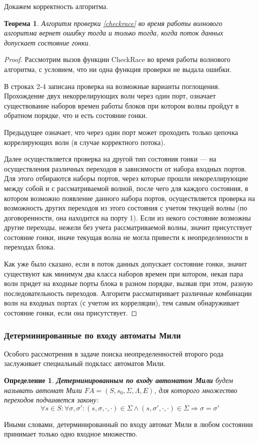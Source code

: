 \documentclass[10pt,a4paper]{article}
\newtheorem{defen}{Определение}
\newtheorem{theorem}{Теорема}
\newcommand{\FA}{F\!A}
\begin{document}
  Докажем корректность алгоритма.
  \begin{theorem}
    Алгоритм проверки \ref{checkrace} во время работы волнового алгоритма вернет ошибку
    тогда и только тогда, когда поток данных допускает состояние гонки.
  \end{theorem}
  \begin{proof}
    Рассмотрим вызов функции CheckRace во время работы волнового алгоритма, с условием, что ни одна функция проверки не выдала ошибки.
    
    В строках 2-4 записана проверка на возможные варианты поглощения. Прохождение двух некоррелирующих волн через один порт, означает существование наборов времен
    работы блоков при котором волны пройдут в обратном порядке, что и есть состояние гонки.
    
    Предыдущее означает, что через один порт может проходить только цепочка коррелирующих волн (в случае корректного потока).
    
    Далее осуществляется проверка на другой тип состояния гонки --- на осуществления различных переходов в зависимости от набора входных портов.
    Для этого отбираются наборы портов, через которые прошли некореллирующие между собой и с рассматриваемой волной, после чего для каждого состояния,
    в котором возможно появление данного набора портов, осуществляется проверка на возможность других переходов из этого состояния с учетом текущей волны
    (по договоренности, она находится на порту 1). Если из некого состояние возможны другие переходы, нежели без учета рассматриваемой волны,
    значит присутствует состояние гонки, иначе текущая волна не могла привести к неопределенности в переходах блока.
    
    Как уже было сказано, если в поток данных допускает состояние гонки, значит существуют как минимум два класса наборов времен
    при котором, некая пара волн придет на входные порты блока в разном порядке, вызвав при этом, разную последовательность переходов.
    Алгоритм рассматиривает различные комбинации волн на входных портах (с учетом их корреляции), тем самым обнаруживает состояние гонки, если она присутствует.
  \end{proof}
  
  \subsubsection{Детерминированные по входу автоматы Мили}
    Особого рассмотрения в задаче поиска неопределенностей второго рода заслуживает специальный подкласс автоматов Мили.
    \begin{defen}
      \textbf{Детерминированным по входу автоматом Мили} будем называть автомат Мили $\FA = (S, s_0, \Sigma, \Lambda, E)$, для которого
      множество переходов подчиняется закону:
      $$\forall s \in S: \forall \sigma, \sigma': (s, \sigma, \cdot, \cdot) \in \Sigma \wedge (s, \sigma', \cdot, \cdot) \in \Sigma \Rightarrow \sigma = \sigma'$$
    \end{defen}
    Иными словами, детерминированный по входу автомат Мили в любом состоянии принимает только одно входное множество.
    
\end{document}
